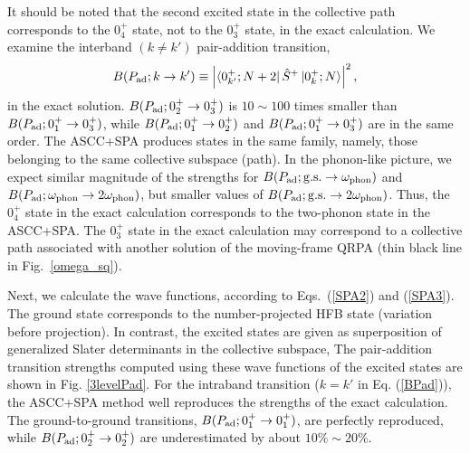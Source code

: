 \documentclass[%
superscriptaddress,
showpacs,
nofootinbib,
amsmath,amssymb,
aps,
prc,
twocolumn,
floatfix ]%
{revtex4-1}
\begin{document}
It should be noted that the second excited state in the collective path
corresponds to the $0_4^+$ state,
not to the $0_3^+$ state, in the exact calculation. 
We examine the interband $(k\neq k')$ pair-addition transition,
\begin{equation}
B(P_{\rm ad};k\rightarrow k') \equiv 
	\left|\bra{0_{k'}^+;N+2} \hat{S}^+ \ket{0_k^+;N}\right|^2 ,
\label{BPad}
\end{equation}
in the exact solution.
$B(P_{\rm ad};0_2^+\rightarrow 0_3^+)$ 
is $10\sim100$ times smaller than $B(P_{\rm ad};0_1^+\rightarrow 0_3^+)$,
while $B(P_{\rm ad};0_1^+\rightarrow 0_2^+)$ and
$B(P_{\rm ad};0_1^+\rightarrow 0_3^+)$ are in the same order.
The ASCC+SPA produces states in the same family,
namely, those belonging to the same collective subspace (path).
In the phonon-like picture,
we expect similar magnitude of the strengths for
$B(P_{\rm ad};{\rm g.s.}\rightarrow \omega_{\rm phon})$
and
$B(P_{\rm ad};\omega_{\rm phon}\rightarrow 2\omega_{\rm phon})$,
but smaller values of
$B(P_{\rm ad};{\rm g.s.}\rightarrow 2\omega_{\rm phon})$.
Thus, the $0_4^+$ state in the exact calculation
corresponds to the two-phonon state in the ASCC+SPA.
The $0_3^+$ state in the exact calculation may correspond to
a collective path associated with another solution of the moving-frame QRPA
(thin black line in Fig.~\ref{omega_sq}).


Next, we calculate the wave functions,
according to Eqs.~(\ref{SPA2}) and (\ref{SPA3}).
The ground state corresponds to the number-projected HFB state
(variation before projection).
In contrast, the excited states are given as superposition of
generalized Slater determinants in the collective subspace,
The pair-addition transition strengths
computed using these wave functions of the excited states
are shown in Fig. \ref{3levelPad}.
For the intraband transition ($k=k'$ in Eq. (\ref{BPad})),
the ASCC+SPA method well reproduces the strengths of the exact calculation.
The ground-to-ground transitions, $B(P_{\rm ad};0_1^+\rightarrow 0_1^+)$, 
are perfectly reproduced, while
$B(P_{\rm ad};0_2^+\rightarrow 0_2^+)$ are underestimated 
by about $10\%\sim20\%$.
\end{document}
